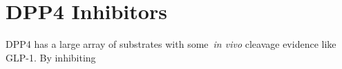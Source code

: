 \section{DPP4 Inhibitors}
DPP4 has a large array of substrates with some~\textit{in vivo} cleavage evidence like GLP-1. By inhibiting 